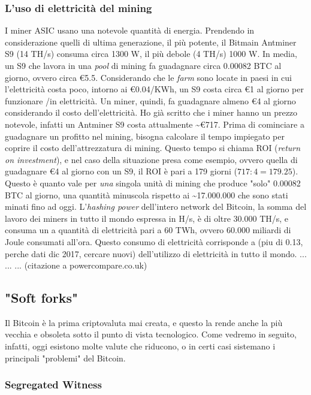 \documentclass {article}
\begin{document}
\subsubsection {L'uso di elettricità del mining}


I miner ASIC usano una notevole quantità di energia. Prendendo in considerazione quelli di ultima generazione, il più potente, il Bitmain Antminer S9 (14 TH/s) consuma circa 1300 W, il più debole (4 TH/s) 1000 W.
In media, un S9 che lavora in una \textit{pool} di mining fa guadagnare circa 0.00082 BTC al giorno, ovvero circa \euro{5.5}.
Considerando che le \textit{farm} sono locate in paesi in cui l'elettricità costa poco, intorno ai \euro{0.04}/KWh, un S9 costa circa \euro{1} al giorno per funzionare /in elettricità.
Un miner, quindi, fa guadagnare almeno \euro{4} al giorno considerando il costo dell'elettricità.
Ho già scritto che i miner hanno un prezzo notevole, infatti un Antminer S9 costa attualmente \textasciitilde \euro{717}.
Prima di cominciare a guadagnare un profitto nel mining, bisogna calcolare il tempo impiegato per coprire il costo dell'attrezzatura di mining.
Questo tempo si chiama ROI (\textit{return on investment}), e nel caso della situazione presa come esempio, ovvero quella di guadagnare \euro{4} al giorno con un S9, il ROI è pari a 179 giorni ($717 : 4 = 179.25$).
Questo è quanto vale per \emph{una} singola unità di mining che produce "solo" 0.00082 BTC al giorno, una quantità minuscola rispetto ai \textasciitilde 17.000.000 che sono stati minati fino ad oggi.
L'\textit{hashing power} dell'intero network del Bitcoin, la somma del lavoro dei miners in tutto il mondo espressa in H/s, è di oltre 30.000 TH/s, e consuma un a quantità di elettricità pari a 60 TWh, ovvero 60.000 miliardi di Joule consumati all'ora.
Questo consumo di elettricità corrisponde a (piu di 0.13, perche dati dic 2017, cercare nuovi) dell'utilizzo di elettricità in tutto il mondo.
... ... ... (citazione a powercompare.co.uk)


\subsection {"Soft forks"}


Il Bitcoin è la prima criptovaluta mai creata, e questo la rende anche la più vecchia e obsoleta sotto il punto di vista tecnologico. Come vedremo in seguito, infatti, oggi esistono molte valute che riducono, o in certi casi sistemano i principali "problemi" del Bitcoin.


\subsubsection {Segregated Witness}
\end{document}
